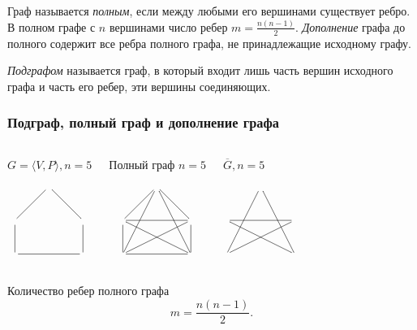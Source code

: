 Граф называется \emph{полным}, если между любыми его вершинами существует ребро. В полном графе с $n$ вершинами число ребер $m=\frac{n(n-1)}{2}$. \emph{Дополнение} графа до полного содержит все ребра полного графа, не принадлежащие исходному графу.

\emph{Подграфом} называется граф, в который входит лишь часть вершин исходного графа и часть его ребер, эти вершины соединяющих.

\begin{frame}
    \frametitle{Подграф, полный граф и дополнение графа}

    \begin{columns}
            \begin{block}{$G=\langle V,P\rangle,n=5$}
                \[
                    {\xymatrix{
                        *{} 
                            & \ar@{-}[dr] \ar@{-}[dl] 
                                &*{}
                                    \\
                        {} 
                            &*{}
                                & \ar@{-}[d] 
                                    \\
                        \ar@{-}[u] 
                            &*{}
                                & \ar@{-}[ll]
                    }}
                \]
            \end{block}
        
            \begin{block}{Полный граф $n=5$}
                \[
                    {\xymatrix{
                        *{} 
                            & \ar@{-}[dr] \ar@{-}[ddr] \ar@{-}[ddl] \ar@{-}[dl] 
                                &*{}
                                    \\
                        {} 
                            &*{}
                                & \ar@{-}[d] \ar@{-}[dll] \ar@{-}[ll] 
                                    \\
                        \ar@{-}[u] 
                            &*{}
                                & \ar@{-}[ll] \ar@{-}[ull] 
                    }}
                \]
            \end{block}
            \begin{block}{$\overline{G}, n=5$}
                \[
                    {\xymatrix{
                        *{} 
                            & \ar@{-}[ddr] \ar@{-}[ddl] 
                                &*{}
                                    \\
                        {} 
                            &*{}
                                & \ar@{-}[dll] \ar@{-}[ll] 
                                    \\
                        {} 
                            &*{}
                                & \ar@{-}[ull] 
                    }}
                \]
            \end{block}
    \end{columns}
    
    Количество ребер полного графа 
    \[
        m=\frac{n(n-1)}{2}.
    \]
\end{frame}

